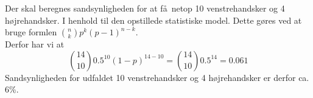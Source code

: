 {
Der skal beregnes sandsynligheden for at f\aa\ netop 10 venstrehandsker og 4 h\o jrehandsker. I henhold til den opstillede statistiske model. Dette g\o res ved at bruge formlen $\binom{n}{k}p^k(p-1)^{n-k}$. \\

Derfor har vi at
\[
\binom{14}{10}0.5^10(1-p)^{14-10} = \binom{14}{10}0.5^14 = 0.061
\]
Sandsynligheden for udfaldet 10 venstrehandsker og 4 h\o jrehandsker er derfor ca. 6\%.

}
